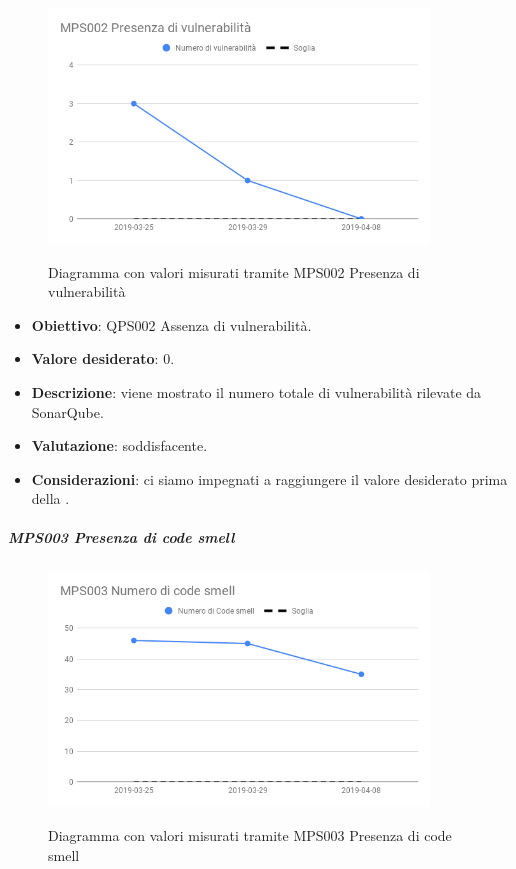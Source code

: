 	\begin{figure}[H]
		\centering
		\includegraphics[width=0.9\textwidth]{img/cruscotti/RQ/MPS002.png}
		\label{immaginePresenzaVulnerabilitàRQ}
		\caption{Diagramma con valori misurati tramite MPS002 Presenza di vulnerabilità}
	\end{figure}
	
	\begin{itemize}
		\item \textbf{Obiettivo}: QPS002 Assenza di vulnerabilità.
		\item \textbf{Valore desiderato}: 0.
		\item \textbf{Descrizione}: viene mostrato il numero totale di vulnerabilità rilevate da SonarQube.
		\item \textbf{Valutazione}: soddisfacente.
		\item \textbf{Considerazioni}: ci siamo impegnati a raggiungere il valore desiderato prima della \RQ.
	\end{itemize}
	
	\subparagraph{MPS003 Presenza di code smell}
	
	\begin{figure}[H]
		\centering
		\includegraphics[width=0.9\textwidth]{img/cruscotti/RQ/MPS003.png}
		\label{immaginePresenzaCodeSmellRQ}
		\caption{Diagramma con valori misurati tramite MPS003 Presenza di code smell}
	\end{figure}
	
